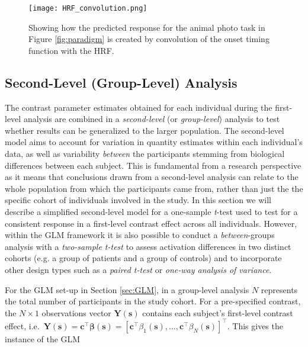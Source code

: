 \begin{figure}[!ht]
\centering
	\texttt{[image: HRF\_convolution.png]}
\caption{Showing how the predicted response for the animal photo task in Figure \ref{fig:paradigm} is created by convolution of the onset timing function with the HRF.}
\label{fig:convolution}
\end{figure}

\subsection{Second-Level (Group-Level) Analysis}
\label{sec:group_level}

The contrast parameter estimates obtained for each individual during the first-level analysis are combined in a \textit{second-level} (or \textit{group-level}) analysis to test whether results can be generalized to the larger population. The second-level model aims to account for variation in quantity estimates within each individual's data, as well as variability \textit{between} the participants stemming from biological differences between each subject.  This is fundamental from a research perspective as it means that conclusions drawn from a second-level analysis can relate to the whole population from which the participants came from, rather than just the the specific cohort of individuals involved in the study. In this section we will describe a simplified second-level model for a one-sample \textit{t}-test used to test for a consistent response in a first-level contrast effect across all individuals. However, within the GLM framework it is also possible to conduct a \textit{between}-groups analysis with a \textit{two-sample t-test} to assess activation differences in two distinct cohorts (e.g. a group of patients and a group of controls) and to incorporate other design types such as a \textit{paired t-test} or \textit{one-way analysis of variance}.   

For the GLM set-up in Section \ref{sec:GLM}, in a group-level analysis $N$ represents the total number of participants in the study cohort. For a pre-specified contrast, the $N \times 1$ observations vector $\bm{Y}(\bm{s})$ contains each subject's first-level contrast effect, i.e.\ $\bm{Y}(\bm{s}) = \bm{c}^{\intercal}\bm{\beta}(\bm{s}) = [\bm{c}^{\intercal}\beta_{1}(\bm{s}), ..., \bm{c}^{\intercal}\beta_{N}(\bm{s})]^{\intercal}$. This gives the instance of the GLM 

